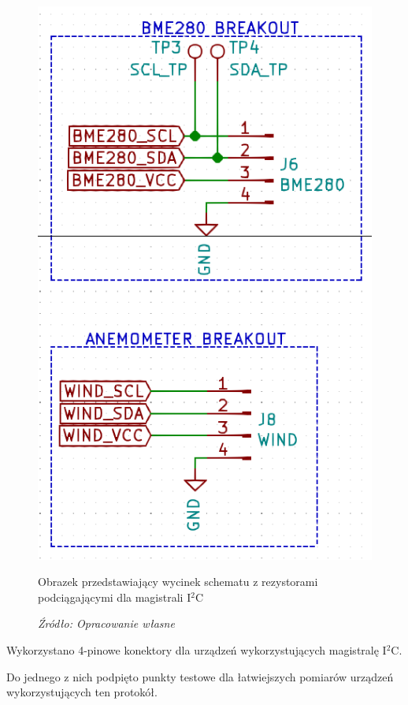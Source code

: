 \documentclass[12pt,a4paper,oneside]{memoir}
\begin{document}
\begin{figure}[!h]
	\centering
	\includegraphics[scale=0.25]{images/sch/sch-11.png}
	{\tytulyrozdzialow \footnotesize \caption[Schemat - rezystory interfejsu I$^2$C] {Obrazek przedstawiający wycinek schematu z rezystorami podciągającymi dla magistrali I$^2$C}}
	\caption*{\textit{Źródło: Opracowanie własne}}
\end{figure}
\par Wykorzystano 4-pinowe konektory dla urządzeń wykorzystujących magistralę I$^2$C. 
\par Do jednego z nich podpięto punkty testowe dla łatwiejszych pomiarów urządzeń wykorzystujących ten protokół.
\newpage
\end{document}
